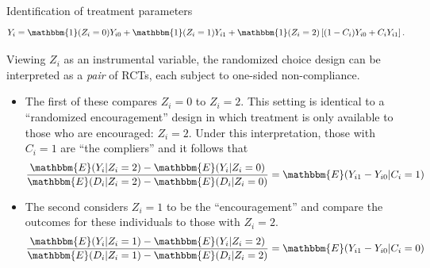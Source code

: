 \documentclass[8pt]{beamer}
\begin{document}
 
 
\begin{frame}{Identification of treatment parameters}
\label{identification_randomized_choice}
\begin{equation*}
    Y_i = \mathbbm{1}(Z_i =0) Y_{i0} + \mathbbm{1}(Z_i = 1)  Y_{i1}  + \mathbbm{1}(Z_i = 2) \left[(1 - C_i) Y_{i0} + C_i Y_{i1} \right].
\label{eq:potentialOutcomes}
\end{equation*}

    Viewing $Z_i$ as an instrumental variable, the randomized choice design can be interpreted as a \emph{pair} of RCTs, each subject to one-sided non-compliance. \\
    \begin{itemize}
        \item The first of these compares $Z_i=0$ to $Z_i = 2$.  This setting is identical to a ``randomized encouragement'' design in which treatment is only available to those who are encouraged: $Z_i = 2$. Under this interpretation, those with $C_i = 1$ are ``the compliers'' and it follows that 
\begin{equation*}
\frac{\mathbbm{E}(Y_i|Z_i=2) - \mathbbm{E}(Y_i|Z_i =0)}{\mathbbm{E}(D_i|Z_i=2)-\mathbbm{E}(D_i|Z_i=0)}  = \mathbbm{E}(Y_{i1} - Y_{i0}|C_i = 1)
\label{eq:ToT}
\end{equation*}

\item The second considers $Z_i = 1$ to be the ``encouragement'' and compare the outcomes for these individuals to those with $Z_i = 2$.
\begin{equation*}
\frac{\mathbbm{E}(Y_i|Z_i=1) - \mathbbm{E}(Y_i|Z_i =2)}{\mathbbm{E}(D_i|Z_i=1)-\mathbbm{E}(D_i|Z_i=2)}  = \mathbbm{E}(Y_{i1} - Y_{i0} | C_i = 0)
\label{eq:TuT}
\end{equation*}
    \end{itemize}

\hyperlink{rc_design}{}


\end{frame}
\end{document}
